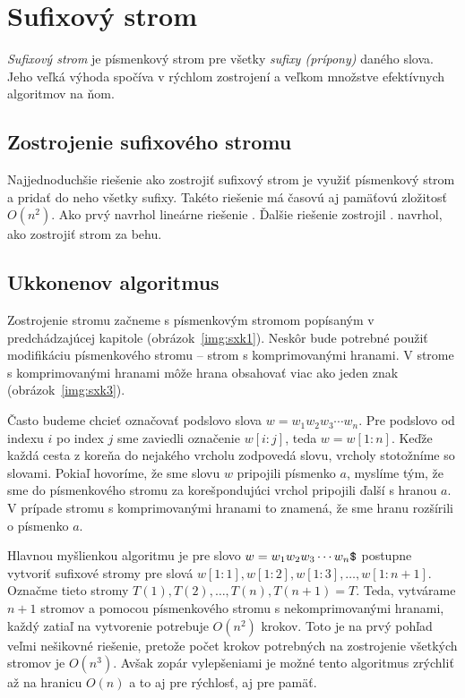 \chapter{Sufixový strom}\label{chap:sx}

\emph{Sufixový strom} je písmenkový strom pre všetky \emph{sufixy (prípony)} 
daného slova. Jeho veľká výhoda spočíva v rýchlom zostrojení a veľkom množstve 
efektívnych algoritmov na ňom. 

\section{Zostrojenie sufixového stromu}
Najjednoduchšie riešenie ako zostrojiť sufixový strom
je využiť písmenkový strom a pridať do neho všetky sufixy. Takéto riešenie má 
časovú aj pamäťovú zložitosť $O(n^2)$. Ako prvý navrhol lineárne riešenie 
\citet{weiner}. Ďalšie riešenie zostrojil \citet{McCreight}. \citet{ukkonen} 
navrhol, ako zostrojiť strom za behu. 

\section{Ukkonenov algoritmus}

Zostrojenie stromu začneme s písmenkovým stromom popísaným v predchádzajúcej 
kapitole (obrázok~\ref{img:sxk1}). Neskôr bude potrebné použiť modifikáciu 
písmenkového stromu -- strom s komprimovanými hranami. V strome s 
komprimovanými hranami môže hrana obsahovať viac ako jeden znak 
(obrázok~\ref{img:sxk3}).

Často budeme chcieť označovať podslovo slova $w = w_1w_2w_3\cdots w_n$. 
Pre podslovo od indexu $i$ po index $j$ sme zaviedli označenie $w[i:j]$, teda 
$w = w[1:n]$. Keďže každá cesta z koreňa do nejakého vrcholu zodpovedá slovu, 
vrcholy stotožníme so slovami. Pokiaľ hovoríme, že sme slovu $w$ 
pripojili písmenko $a$, myslíme tým, že sme do písmenkového stromu za 
korešpondujúci vrchol pripojili ďalší s hranou $a$. V prípade stromu s 
komprimovanými hranami to znamená, že sme hranu rozšírili o písmenko $a$.

Hlavnou myšlienkou algoritmu je pre slovo $w = w_1w_2w_3\cdots w_n\hbox{\tt\$}$ 
postupne vytvoriť sufixové stromy pre slová $w[1:1], w[1:2], w[1:3], \ldots, 
w[1:n+1]$. Označme tieto stromy $T(1), T(2),\ldots, T(n), T(n+1) = T$. 
Teda, vytvárame $n+1$ stromov a pomocou písmenkového stromu s nekomprimovanými 
hranami, každý zatiaľ na vytvorenie potrebuje $O(n^2)$ 
krokov. Toto je na prvý pohľad veľmi nešikovné riešenie, pretože počet 
krokov potrebných na zostrojenie všetkých stromov je $O(n^3)$. 
Avšak zopár vylepšeniami je možné tento algoritmus zrýchliť až na hranicu 
$O(n)$ a to aj pre rýchlosť, aj pre pamäť. 

